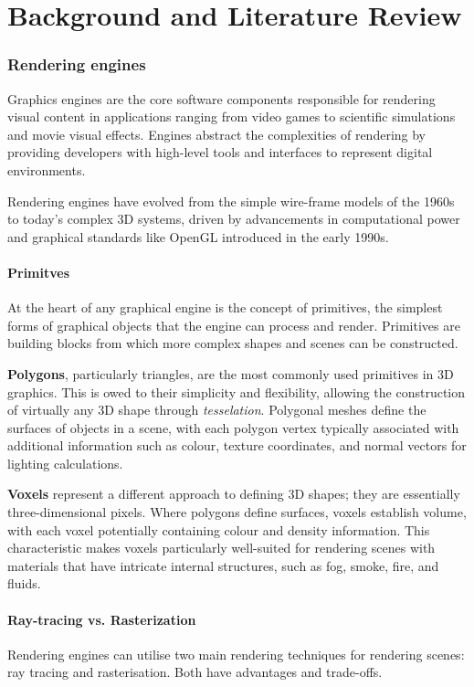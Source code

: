 
\part{Background and Literature Review}\label{backgorund}
\section{Rendering engines}
Graphics engines are the core software components responsible for rendering visual content in applications ranging from video games to scientific simulations and movie visual effects.
Engines abstract the complexities of rendering by providing developers with high-level tools and interfaces to represent digital environments.

Rendering engines have evolved from the simple wire-frame models of the 1960s to today's complex 3D systems, driven by advancements in computational power and graphical standards\supercite{old} like OpenGL introduced in the early 1990s.

\subsection{Primitves}
At the heart of any graphical engine is the concept of primitives, the simplest forms of graphical objects that the engine can process and render. Primitives are building blocks from which more complex shapes and scenes can be constructed.

\textbf{Polygons}, particularly triangles, are the most commonly used primitives in 3D graphics. This is owed to their simplicity and flexibility, allowing the construction of virtually any 3D shape through \emph{tesselation}. Polygonal meshes define the surfaces of objects in a scene, with each polygon vertex typically associated with additional information such as colour, texture coordinates, and normal vectors for lighting calculations.

\textbf{Voxels} represent a different approach to defining 3D shapes; they are essentially three-dimensional pixels. Where polygons define surfaces, voxels establish volume, with each voxel potentially containing colour and density information.
This characteristic makes voxels particularly well-suited for rendering scenes with materials that have intricate internal structures, such as fog, smoke, fire, and fluids.

\subsection{Ray-tracing vs. Rasterization}
Rendering engines can utilise two main rendering techniques for rendering scenes: ray tracing and rasterisation. Both have advantages and trade-offs.

